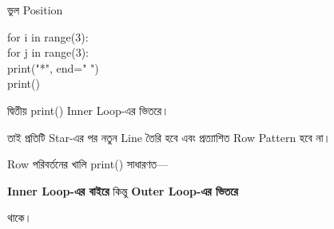 \begin{codeoutputbox}{ভুল Position}

\noindent
\begin{minipage}[t]{0.53\linewidth}
\codeheading

\begin{english}
\ttfamily
for i in range(3):\\
\hspace*{4mm}for j in range(3):\\
\hspace*{8mm}print("*", end=" ")\\
\hspace*{8mm}print()
\end{english}

\end{minipage}
\hfill
\begin{minipage}[t]{0.43\linewidth}
\outputheading

দ্বিতীয়
\textenglish{\ttfamily print()}
Inner Loop-এর ভিতরে।

তাই প্রতিটি Star-এর পর নতুন Line তৈরি হবে এবং প্রত্যাশিত Row Pattern হবে না।

\end{minipage}

\end{codeoutputbox}

\begin{rememberbox}

Row পরিবর্তনের খালি
\textenglish{\ttfamily print()}
সাধারণত—

\begin{center}

\textbf{Inner Loop-এর বাইরে}
\qquad
কিন্তু
\qquad
\textbf{Outer Loop-এর ভিতরে}

\end{center}

থাকে।

\end{rememberbox}



